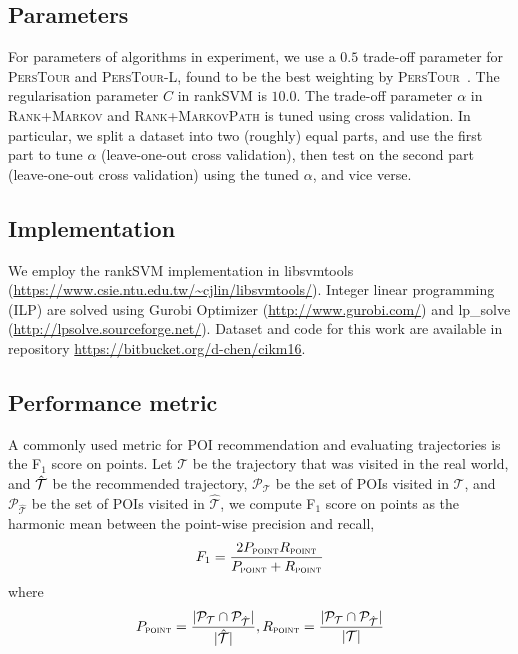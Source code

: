 \subsection{Parameters}
For parameters of algorithms in experiment,
we use a $0.5$ trade-off parameter for \textsc{PersTour} and \textsc{PersTour-L}, found to be the best weighting by \textsc{PersTour}~\cite{ijcai15}.
The regularisation parameter $C$ in rankSVM is $10.0$.
The trade-off parameter $\alpha$ in \textsc{Rank+Markov} and \textsc{Rank+MarkovPath} is tuned using cross validation.
In particular, we split a dataset into two (roughly) equal parts, and use the first part to tune $\alpha$ (leave-one-out cross validation),
then test on the second part (leave-one-out cross validation) using the tuned $\alpha$, and vice verse. 

\subsection{Implementation}
We employ the rankSVM implementation in libsvmtools (\url{https://www.csie.ntu.edu.tw/~cjlin/libsvmtools/}).
Integer linear programming (ILP) are solved using Gurobi Optimizer (\url{http://www.gurobi.com/})
and lp\_solve (\url{http://lpsolve.sourceforge.net/}).
Dataset and code for this work are available in repository \url{https://bitbucket.org/d-chen/cikm16}.

\subsection{Performance metric}
A commonly used metric for POI recommendation and evaluating trajectories is
the F$_1$ score on points.
Let $\mathcal{T}$ be the trajectory that was visited in the real world,
and $\hat{\cal T}$ be the recommended trajectory,
$\mathcal{P}_{\mathcal{T}}$ be the set of POIs visited in $\mathcal{T}$,
and $\mathcal{P}_{\hat{\mathcal{T}}}$ be the set of POIs visited in $\hat{\mathcal{T}}$,
we compute F$_1$ score on points as the harmonic mean between the point-wise precision and recall,
\begin{displaymath}
F_1= \frac{2  P_{\textsc{point}}  R_{\textsc{point}}}
          {P_{\textsc{point}} + R_{\textsc{point}}}
\end{displaymath}
where
\vspace{-1.1em}
\begin{displaymath}%
P_{\textsc{point}} = \frac{|\mathcal{P}_{\mathcal{T}} \cap \mathcal{P}_{\hat{\mathcal{T}}}|}
                          {|\hat{\mathcal{T}}|},
R_{\textsc{point}} = \frac{|\mathcal{P}_{\mathcal{T}} \cap \mathcal{P}_{\hat{\mathcal{T}}}|}
                          {|\mathcal{T}|}
\end{displaymath}

